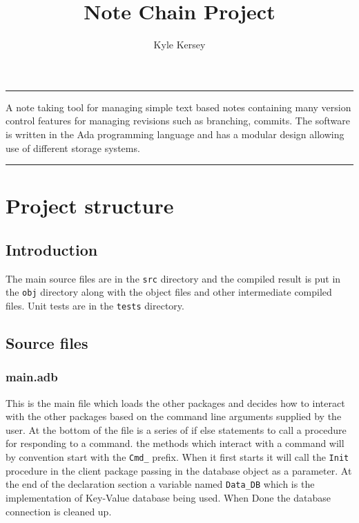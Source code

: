 \documentclass[12pt,a4paper]{article}
\renewenvironment{abstract}{%
\hfill\begin{minipage}{0.95\textwidth}
\rule{\textwidth}{1pt}}
{\par\noindent\rule{\textwidth}{1pt}\end{minipage}}
\newcommand{\codetext}[1]{\colorbox{light-gray}{\texttt{#1}}}
\begin{document}
%
\title{\textbf{Note Chain Project}}
\author{Kyle Kersey}
\date{}

\clearpage
\maketitle
%
\begin{abstract}
A note taking tool for managing simple text based notes containing many version control features for managing revisions such as branching, commits. The software is written in the Ada programming language and has a modular design allowing use of different storage systems.
\end{abstract}

\renewcommand\cftsecleader{\cftdotfill{\cftdotsep}}

\tableofcontents
\thispagestyle{empty}
\pagebreak
\setcounter{page}{1}


\section{Project structure}

\subsection{Introduction}
The main source files are in the \codetext{src} directory and the compiled result is put in the 
\codetext{obj} directory along with the object files and other intermediate compiled files. Unit tests are in the \codetext{tests} directory.

\subsection{Source files}
\subsubsection{main.adb}
This is the main file which loads the other packages and decides how to interact with the other packages based on the command line arguments supplied by the user. At the bottom of the file is a series of if else statements to call a procedure for responding to a command. the methods which interact with a command will by convention start with the \codetext{Cmd\_} prefix. When it first starts it will call the \codetext{Init} procedure in the client package passing in the database object as a parameter. At the end of the declaration section a variable named \codetext{Data\_DB} which is the implementation of Key-Value database being used. When Done the database connection is cleaned up.
\end{document}
